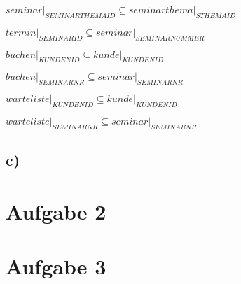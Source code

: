 \documentclass[10pt,a4paper]{report}
\begin{document}
$seminar\vert_{SEMINARTHEMAID} \subseteq seminarthema\vert_{STHEMAID}$

$termin\vert_{SEMINARID} \subseteq seminar\vert_{SEMINARNUMMER}$

$buchen\vert_{KUNDENID} \subseteq kunde\vert_{KUNDENID}$

$buchen\vert_{SEMINARNR} \subseteq seminar\vert_{SEMINARNR}$

$warteliste\vert_{KUNDENID} \subseteq kunde\vert_{KUNDENID}$

$warteliste\vert_{SEMINARNR} \subseteq seminar\vert_{SEMINARNR}$

\subsection{c)}



\section{Aufgabe 2}


\section{Aufgabe 3}

\end{document}
